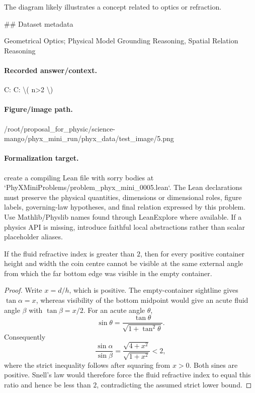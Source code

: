 The diagram likely illustrates a concept related to optics or refraction.

\#\# Dataset metadata

Geometrical Optics; Physical Model Grounding Reasoning, Spatial Relation Reasoning

\paragraph{Recorded answer/context.}
C: C: \textbackslash{}( n>2 \textbackslash{})

\paragraph{Figure/image path.}
/root/proposal\_for\_physic/science-mango/phyx\_mini\_run/phyx\_data/test\_image/5.png

\paragraph{Formalization target.}
create a compiling Lean file with sorry bodies at `PhyXMiniProblems/problem\_phyx\_mini\_0005.lean`. The Lean declarations must preserve the physical quantities, dimensions or dimensional roles, figure labels, governing-law hypotheses, and final relation expressed by this problem.
Use Mathlib/Physlib names found through LeanExplore where available. If a physics API is missing, introduce faithful local abstractions rather than scalar placeholder aliases.

\begin{theorem}
\label{thm:physics:phyx_mini_0005:target}
If the fluid refractive index is greater than \(2\), then for every positive
container height and width the coin centre cannot be visible at the same
external angle from which the far bottom edge was visible in the empty
container.
\end{theorem}
\begin{proof}
Write \(x=d/h\), which is positive.  The empty-container sightline gives
\(\tan\alpha=x\), whereas visibility of the bottom midpoint would give an
acute fluid angle \(\beta\) with \(\tan\beta=x/2\).  For an acute angle
\(\theta\),
\[
  \sin\theta=\frac{\tan\theta}{\sqrt{1+\tan^2\theta}}.
\]
Consequently
\[
 \frac{\sin\alpha}{\sin\beta}
 =\frac{\sqrt{4+x^2}}{\sqrt{1+x^2}}<2,
\]
where the strict inequality follows after squaring from \(x>0\).  Both sines
are positive.  Snell's law would therefore force the fluid refractive index
to equal this ratio and hence be less than \(2\), contradicting the assumed
strict lower bound.
\end{proof}

